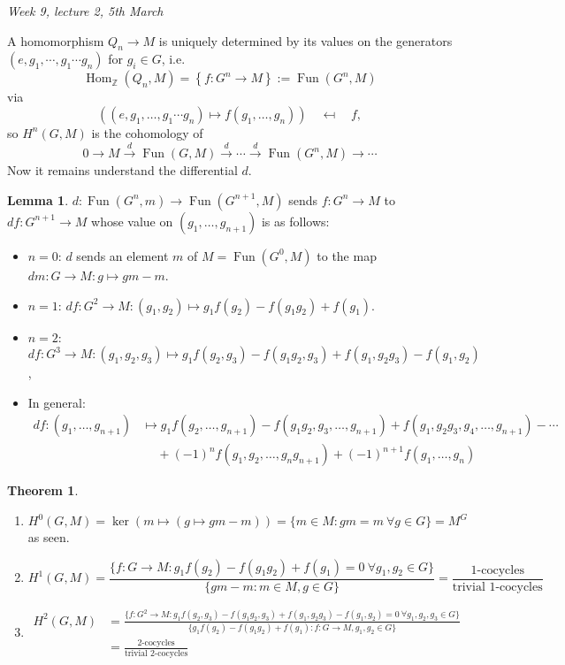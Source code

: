 \documentclass{article}
\newcommand{\Z}{\mathbb{Z}}
\newcommand{\Fun}{\operatorname{Fun}}
\newcommand{\Hom}{\operatorname{Hom}}
\theoremstyle{definition}
\newtheorem{thm}[defn]{Theorem}
\newtheorem{lemma}[defn]{Lemma}
\begin{document}
\begin{flushright}
\textit{Week 9, lecture 2, 5th March}
\end{flushright}

A homomorphism $Q_n\rightarrow M$ is uniquely determined by its values on the generators $(e,g_1,\cdots,g_1\cdots g_n)$ for $g_i\in G$, i.e.
\[
\Hom_\Z(Q_n,M)=\left\{f:G^n\rightarrow M\right\}:=\Fun(G^n,M)
\]
via
\[
((e,g_1,\ldots,g_1\cdots g_n) \mapsto f(g_1,\ldots,g_n)) \quad \mappedfrom \quad f,
\]
so $H^n(G,M)$ is the cohomology of
\[
0\rightarrow M\xrightarrow{d}\Fun(G,M)\xrightarrow{d}\cdots\xrightarrow{d}\Fun(G^n,M)\rightarrow\cdots
\]
Now it remains understand the differential $d$.
\begin{lemma}
$d:\Fun(G^n,m)\rightarrow \Fun(G^{n+1},M)$ sends $f:G^n\rightarrow M$ to $df:G^{n+1}\rightarrow M$ whose value on $(g_1,\ldots,g_{n+1})$ is as follows:
\begin{itemize}
\item $n=0$: $d$ sends an element $m$ of $M=\Fun(G^0,M)$ to the map $dm:G\rightarrow M:g\mapsto gm-m$.
\item $n=1$: $df:G^2\rightarrow M:(g_1,g_2)\mapsto g_1f(g_2)-f(g_1g_2)+f(g_1)$.
\item $n=2$: $df:G^3\rightarrow M:(g_1,g_2,g_3)\mapsto g_1f(g_2,g_3)-f(g_1g_2,g_3)+f(g_1,g_2g_3)-f(g_1,g_2)$,
\item In general:
\[
\begin{aligned}
df:(g_1,\ldots,g_{n+1})&\mapsto g_1f(g_2,\ldots,g_{n+1})-f(g_1g_2,g_3,\ldots,g_{n+1})+f(g_1,g_2g_3,g_4,\ldots,g_{n+1})-\cdots\\
&\quad \ +(-1)^nf(g_1,g_2,\ldots,g_ng_{n+1})+(-1)^{n+1}f(g_1,\ldots,g_n)
\end{aligned}
\]
\end{itemize}
\end{lemma}

\begin{thm}
\begin{enumerate}
\item $H^0(G,M)=\ker(m\mapsto (g\mapsto gm-m))=\{m\in M:gm=m \ \forall g\in G\}=M^G$ as seen.
\item
\[
H^1(G,M)=\frac{\{f:G\rightarrow M:g_1f(g_2)-f(g_1g_2)+f(g_1)=0 \ \forall g_1,g_2\in G\}}{\{gm-m:m\in M,g\in G\}}=\frac{\text{1-cocycles}}{\text{trivial 1-cocycles}}
\]
\item \[
\begin{aligned}
H^2(G,M)&=\frac{\{f:G^2\rightarrow M:g_1f(g_2,g_3)-f(g_1g_2,g_3)+f(g_1,g_2g_3)-f(g_1,g_2)=0 \ \forall g_1,g_2,g_3\in G\}}{\{g_1f(g_2)-f(g_1g_2)+f(g_1): f:G\rightarrow M,g_1,g_2\in G\}}\\&=\frac{\text{2-cocycles}}{\text{trivial 2-cocycles}}
\end{aligned}
\]
\end{enumerate}
\end{thm}
\end{document}
